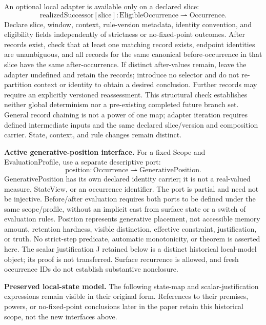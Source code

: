 An optional local adapter is available only on a declared slice:
\[
\mathrm{realizedSuccessor}[\mathrm{slice}]:\mathrm{EligibleOccurrence}\rightharpoonup\mathrm{Occurrence}.
\]
Declare slice, window, context, rule-version metadata, identity convention, and eligibility fields independently of strictness or no-fixed-point outcomes. After records exist, check that at least one matching record exists, endpoint identities are unambiguous, and all records for the same canonical before-occurrence in that slice have the same after-occurrence. If distinct after-values remain, leave the adapter undefined and retain the records; introduce no selector and do not re-partition context or identity to obtain a desired conclusion. Further records may require an explicitly versioned reassessment. This structural check establishes neither global determinism nor a pre-existing completed future branch set. General record chaining is not a power of one map; adapter iteration requires defined intermediate inputs and the same declared slice/version and composition carrier. State, context, and rule changes remain distinct.

\noindent\textbf{Active generative-position interface.} For a fixed Scope and EvaluationProfile, use a separate descriptive port:
\[
\mathrm{position}:\mathrm{Occurrence}\rightharpoonup\mathrm{GenerativePosition}.
\]
GenerativePosition has its own declared identity carrier; it is not a real-valued measure, StateView, or an occurrence identifier. The port is partial and need not be injective. Before/after evaluation requires both ports to be defined under the same scope/profile, without an implicit cast from surface state or a switch of evaluation rules. Position represents generative placement, not accessible memory amount, retention hardness, visible distinction, effective constraint, justification, or truth. No strict-step predicate, automatic monotonicity, or theorem is asserted here. The scalar justification J retained below is a distinct historical local-model object; its proof is not transferred. Surface recurrence is allowed, and fresh occurrence IDs do not establish substantive nonclosure.

\noindent\textbf{Preserved local-state model.} The following state-map and scalar-justification expressions remain visible in their original form. References to their premises, powers, or no-fixed-point conclusions later in the paper retain this historical scope, not the new interfaces above.

